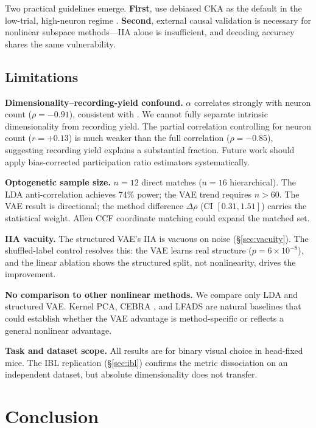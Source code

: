 \documentclass{article}
\begin{document}
Two practical guidelines emerge. \textbf{First}, use debiased CKA as the default in the low-trial, high-neuron regime \citep{murphy2024biased}. \textbf{Second}, external causal validation is necessary for nonlinear subspace methods---IIA alone is insufficient, and decoding accuracy shares the same vulnerability.


\subsection{Limitations}

\textbf{Dimensionality--recording-yield confound.} $\alpha$ correlates strongly with neuron count ($\rho = -0.91$), consistent with \citet{chun2025dimensionality}. We cannot fully separate intrinsic dimensionality from recording yield. The partial correlation controlling for neuron count ($r = +0.13$) is much weaker than the full correlation ($\rho = -0.85$), suggesting recording yield explains a substantial fraction. Future work should apply bias-corrected participation ratio estimators systematically.

\textbf{Optogenetic sample size.} $n = 12$ direct matches ($n = 16$ hierarchical). The LDA anti-correlation achieves 74\% power; the VAE trend requires $n > 60$. The VAE result is directional; the method difference $\Delta\rho$ (CI $[0.31, 1.51]$) carries the statistical weight. Allen CCF coordinate matching could expand the matched set.

\textbf{IIA vacuity.} The structured VAE's IIA is vacuous on noise (\S\ref{sec:vacuity}). The shuffled-label control resolves this: the VAE learns real structure ($p = 6 \times 10^{-8}$), and the linear ablation shows the structured split, not nonlinearity, drives the improvement.

\textbf{No comparison to other nonlinear methods.} We compare only LDA and structured VAE. Kernel PCA, CEBRA \citep{schneider2023learnable}, and LFADS \citep{pandarinath2018inferring} are natural baselines that could establish whether the VAE advantage is method-specific or reflects a general nonlinear advantage.

\textbf{Task and dataset scope.} All results are for binary visual choice in head-fixed mice. The IBL replication (\S\ref{sec:ibl}) confirms the metric dissociation on an independent dataset, but absolute dimensionality does not transfer.


\section{Conclusion}
\end{document}
